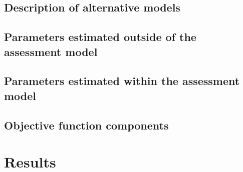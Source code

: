 \documentclass[11pt,
  english,
  a4paper,
]{article}
\begin{document}
\leavevmode\tagmcend\tagstructend


\hypertarget{description-of-alternative-models}{%
\subsection{Description of alternative models}\label{description-of-alternative-models}}

\leavevmode\tagmcend\tagstructend


\hypertarget{parameters-estimated-outside-of-the-assessment-model}{%
\subsection{Parameters estimated outside of the assessment model}\label{parameters-estimated-outside-of-the-assessment-model}}

\leavevmode\tagmcend\tagstructend


\hypertarget{parameters-estimated-within-the-assessment-model}{%
\subsection{Parameters estimated within the assessment model}\label{parameters-estimated-within-the-assessment-model}}

\leavevmode\tagmcend\tagstructend


\hypertarget{objective-function-components}{%
\subsection{Objective function components}\label{objective-function-components}}

\leavevmode\tagmcend\tagstructend


\hypertarget{results}{%
\section{Results}\label{results}}

\leavevmode\tagmcend\tagstructend

\end{document}
